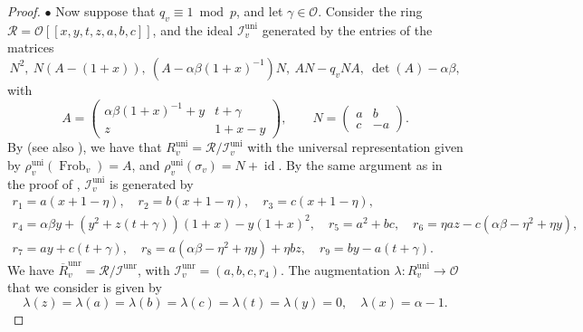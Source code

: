 \documentclass[a4paper, notitlepage, 10pt]{amsart}
\theoremstyle{plain} %
\theoremstyle{definition} %
\theoremstyle{remark} %
\numberwithin{equation}{section}
\newcommand{\Frob}{\operatorname{Frob}} %
\newcommand{\id}{\operatorname{id}} %
\newcommand{\uni}{\operatorname{uni}}
\newcommand{\unr}{\operatorname{unr}}
\begin{document}
\begin{proof}
$\bullet$ Now suppose that $q_v\equiv 1 \bmod p$, and let $\gamma\in \mathcal{O}$. Consider the ring $\mathcal{R}=\mathcal{O}[[x,y,t,z,a,b,c]]$, and the ideal $\mathcal{I}_{v}^{\uni}$ generated by the entries of the matrices
    $$ N^2,\ N(A-(1+x)),\ (A-\alpha\beta(1+x)^{-1})N,\ AN-q_vNA,\ \det(A)-\alpha\beta, $$
    with
    \begin{equation*}
        A=\begin{pmatrix}
        \alpha\beta(1+x)^{-1}+y & t+\gamma \\ z & 1+x-y
    \end{pmatrix},\quad \quad   N=\begin{pmatrix}
        a & b \\ c & -a
    \end{pmatrix}.
    \end{equation*}
    By \cite[\S 5.1 Case ($\varphi$-uni)]{BKM2} (see also \cite[Lemma 2.4]{Calegari18}), we have that $R^{\uni}_v=\mathcal{R}/\mathcal{I}^{\uni}_v$ with the universal representation given by $\rho_v^{\text{uni}}(\Frob_v)=A$, and $\rho_v^{\text{uni}}(\sigma_v)=N+\id$. By the same argument as in the proof of \cite[Lemma 5.2]{BKM2}, $\mathcal{I}^{\uni}_v$ is generated by 
        \begin{gather*}
        r_1=a(x+1-\eta), \quad r_2=b(x+1-\eta), \quad r_3=c(x+1-\eta),
        \\r_4=\alpha\beta y+(y^2+z(t+\gamma))(1+x)-y(1+x)^2,\quad r_5=a^2+bc,\quad  r_6=\eta az- c(\alpha\beta-\eta^2+\eta y), 
        \\ r_7=ay+c(t+\gamma),\quad 
        r_8=a(\alpha\beta-\eta^2+\eta y)+\eta bz, \quad r_9=by-a(t+\gamma).
    \end{gather*}
We have $\overline{R}^{\unr}_v=\mathcal{R}/\mathcal{I}^{\unr}$, with $\mathcal{I}^{\unr}_v=(a,b,c,r_4)$. The augmentation $\lambda\colon R^{\uni}_v\to \mathcal{O}$ that we consider is given by 
    $$ \lambda(z)=\lambda(a)=\lambda(b)=\lambda(c)=\lambda(t)=\lambda(y)=0, \quad \lambda(x)=\alpha-1. $$
    

\end{proof}
\end{document}
